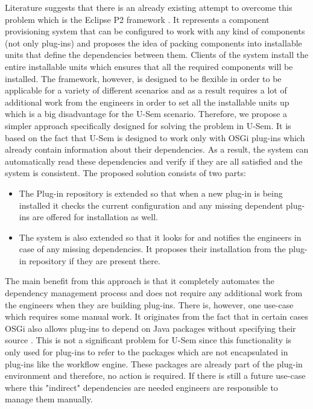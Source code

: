 Literature suggests that there is an already existing attempt to overcome this problem which is the Eclipse P2 framework \cite{le2009dependency}. It represents a component provisioning system that can be configured to work with any kind of components (not only plug-ins) and proposes the idea of packing components into installable units that define the dependencies between them. Clients of the system install the entire installable units which ensures that all the required components will be installed. The framework, however, is designed to be flexible in order to be applicable for a variety of different scenarios and as a result requires a lot of additional work from the engineers in order to set all the installable units up which is a big disadvantage for the U-Sem scenario. Therefore, we propose a simpler approach specifically designed for solving the problem in U-Sem. It is based on the fact that U-Sem is designed to work only with OSGi plug-ins which already contain information about their dependencies. As a result, the system can automatically read these dependencies and verify if they are all satisfied and the system is consistent. The proposed solution consists of two parts:

\begin{itemize}
	\item The Plug-in repository is extended so that when a new plug-in is being installed it checks the current configuration and any missing dependent plug-ins are offered for installation as well.
	\item The system is also extended so that it looks for and notifies the engineers in case of any missing dependencies. It  proposes their installation from the plug-in repository if they are present there.
\end{itemize}


The main benefit from this approach is that it completely automates the dependency management process and does not require any additional work from the engineers when they are building plug-ins. There is, however, one use-case which requires some manual work. It originates from the fact that in certain cases OSGi also allows plug-ins to depend on Java packages without specifying their source \cite{bartlett2009OSGi}. This is not a significant problem for U-Sem since this functionality is only used for plug-ins to refer to the packages which are not encapsulated in plug-ins like the workflow engine. These packages are already part of the plug-in environment and therefore, no action is required. If there is still a future use-case where this "indirect" dependencies are needed engineers are responsible to manage them manually.


